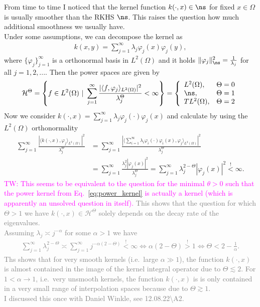 \documentclass[a4paper, 10pt]{article}
\newcommand{\tw}[1]{\textcolor{magenta}{TW: #1}}
\begin{document}
From time to time I noticed that the kernel function $k(\cdot, x) \in \ns$ for fixed $x \in \Omega$ is usually smoother than the RKHS $\ns$. 
This raises the question how much additional smoothness we usually have. \\
Under some assumptions, we can decompose the kernel as
\begin{align*}
k(x, y) = \sum_{j=1}^\infty \lambda_j \varphi_j(x) \varphi_j(y),
\end{align*}
where $\{ \varphi_j \}_{j=1}^\infty$ is a orthonormal basis in $L^2(\Omega)$ and it holds $\Vert \varphi_j \Vert_{\ns}^2 = \frac{1}{\lambda_j}$ for all $j = 1, 2, ...$.
Then the power spaces are given by
\begin{align*}
\mathcal{H}^\Theta = \left\{ f \in L^2(\Omega) ~ | ~ \sum_{j=1}^\infty \frac{|\langle f, \varphi_j \rangle_{L^2(\Omega)}|^2}{\lambda_j^\Theta} < \infty \right\} 
 = \left\{
\begin{array}{ll}
L^2(\Omega), & \Theta = 0 \\
\ns, & \Theta = 1 \\
TL^2(\Omega), & \Theta = 2
\end{array}
\right.
\end{align*}
Now we consider $k(\cdot, x) = \sum_{j=1}^\infty \lambda_j \varphi_j(\cdot) \varphi_j(x)$ and calculate by using the $L^2(\Omega)$ orthonormality
\begin{align*}
\sum_{j=1}^\infty \frac{|\langle k(\cdot, x), \varphi_j \rangle_{L^2(\Omega)}|^2}{\lambda_j^\Theta}
&= \sum_{j=1}^\infty \frac{|\langle \sum_{i=1}^\infty \lambda_i \varphi_i(\cdot) \varphi_i(x), \varphi_j \rangle_{L^2(\Omega)}|^2}{\lambda_j^\Theta} \\
&= \sum_{j=1}^\infty \frac{\lambda_j^2 |\varphi_j(x)|^2}{\lambda_j^\Theta} = \sum_{j=1}^\infty \lambda_j^{2 - \Theta} |\varphi_j(x)|^2 \stackrel{!}{<} \infty.
\end{align*}
\tw{This seems to be equivalent to the question for the minimal $\theta > 0$ such that the power kernel from Eq.~\eqref{eq:power_kernel} is actually a kernel (which is apparently an unsolved question in itself).}
\textcolor{gray}{
This shows that the question for which $\Theta > 1$ we have $k(\cdot, x) \in \mathcal{H}^\Theta$ solely depends on the decay rate of the eigenvalues. \\
Assuming $\lambda_j \asymp j^{-\alpha}$ for some $\alpha > 1$ we have 
\begin{align*}
\sum_{j=1}^\infty \lambda_j^{2 - \Theta} \asymp \sum_{j=1}^\infty j^{-\alpha(2 - \Theta)} \stackrel{!}{<} \infty
\Leftrightarrow \alpha (2-\Theta) \stackrel{!}{>} 1 
\Leftrightarrow \Theta < 2 - \frac{1}{\alpha}.
\end{align*}
Ths shows that for very smooth kernels (i.e.\ large $\alpha \gg 1$), the function $k(\cdot, x)$ is almost contained in the image of the kernel integral operator due to $\Theta \lesssim 2$.
For $1 < \alpha \rightarrow 1$, i.e.\ very unsmooth kernels, the function $k(\cdot, x)$ is is only contained in a very small range of interpolation spaces because  due to $\Theta \gtrsim 1$. \\
I discussed this once with Daniel Winkle, see 12.08.22\textbackslash A2.}
\end{document}
